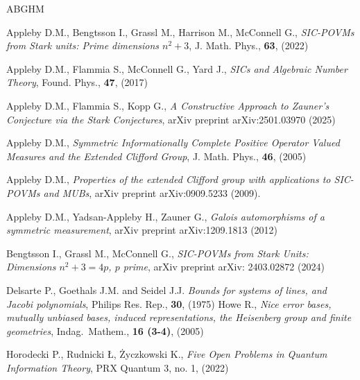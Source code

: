\documentclass[12pt]{article}
\begin{document}
\begin{thebibliography}{ABGHM}
	

Appleby D.M., Bengtsson I., Grassl M., Harrison M., McConnell G.,
\textit{SIC-POVMs from Stark units: Prime dimensions $n^2+ 3$},
J. Math. Phys.,
{\bf 63}, 
(2022)

Appleby D.M., Flammia S., McConnell G.,  Yard J.,
\textit{SICs and Algebraic Number Theory},
Found. Phys.,
{\bf 47}, 
(2017)

Appleby D.M., Flammia S., Kopp G.,
\textit{A Constructive Approach to Zauner’s Conjecture
	via the Stark Conjectures},
arXiv preprint arXiv:2501.03970 (2025)


Appleby D.M.,
\textit{ Symmetric Informationally Complete Positive Operator Valued Measures and the Extended Clifford Group},
J. Math. Phys.,
{\bf 46}, 
(2005)


Appleby D.M.,
\textit{Properties of the extended Clifford group with applications to SIC-POVMs and MUBs},
arXiv preprint arXiv:0909.5233 (2009).


Appleby D.M., Yadsan-Appleby H., Zauner G.,
\textit{Galois automorphisms of a symmetric measurement},
arXiv preprint arXiv:1209.1813 (2012)


Bengtsson I., Grassl M., McConnell G., 
\textit{SIC-POVMs from Stark Units:
	Dimensions $n^2+3=4p$, $p$ prime},
arXiv preprint arXiv: 2403.02872 (2024)


Delsarte P., Goethals J.M. and Seidel J.J. 
\textit{Bounds for systems of lines, and Jacobi
	polynomials},
Philips Res. Rep.,
{\bf 30}, 
(1975)
%
%	
Howe R., 
\textit{Nice error bases, mutually unbiased bases, induced representations, the Heisenberg group and finite geometries},
Indag.\ Mathem.,
{\bf 16 (3-4)}, 
(2005)


Horodecki P.,  Rudnicki \L, \.{Z}yczkowski K.,
\textit{Five Open Problems in Quantum Information Theory},
PRX Quantum 3, no. 1, 
(2022)


\end{thebibliography}
\end{document}
